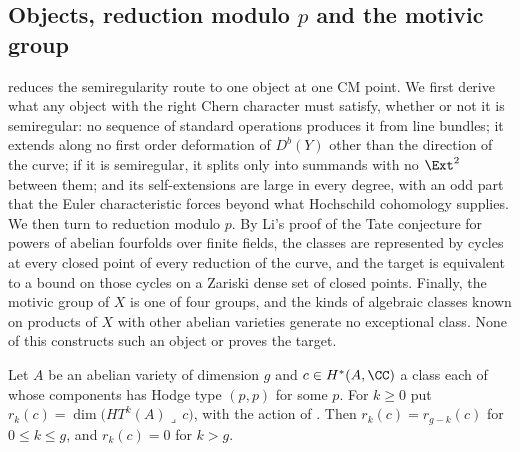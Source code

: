 \subsection{Objects, reduction modulo $p$ and the motivic group}
\label{ssec:mumfordobject}

 reduces the semiregularity route to one object at
one CM point. We first derive what any object with the right Chern character
must satisfy, whether or not it is semiregular: no sequence of standard
operations produces it from line bundles; it extends along no first order
deformation of $D^{b}(Y)$ other than the direction of the curve; if it is
semiregular, it splits only into summands with no $\Ext^{2}$ between them;
and its self-extensions are large in every degree, with an odd part that the
Euler characteristic forces beyond what Hochschild cohomology supplies. We
then turn to reduction modulo $p$. By Li's proof of the Tate conjecture for
powers of abelian fourfolds over finite fields, the classes are represented
by cycles at every closed point of every reduction of the curve, and the
target is equivalent to a bound on those cycles on a Zariski dense set of
closed points. Finally, the motivic group of $X$ is one of four groups, and
the kinds of algebraic classes known on products of $X$ with other abelian
varieties generate no exceptional class. None of this constructs such an
object or proves the target.

\begin{lemma}\label{lem:rankduality}
Let $A$ be an abelian variety of dimension $g$ and $c\in H^{*}(A,\CC)$ a class
each of whose components has Hodge type $(p,p)$ for some $p$. For $k\ge0$ put
$r_{k}(c)=\dim\bigl(HT^{k}(A)\lrcorner\,c\bigr)$, with the action of
. Then $r_{k}(c)=r_{g-k}(c)$ for $0\le k\le g$, and
$r_{k}(c)=0$ for $k>g$.
\end{lemma}

